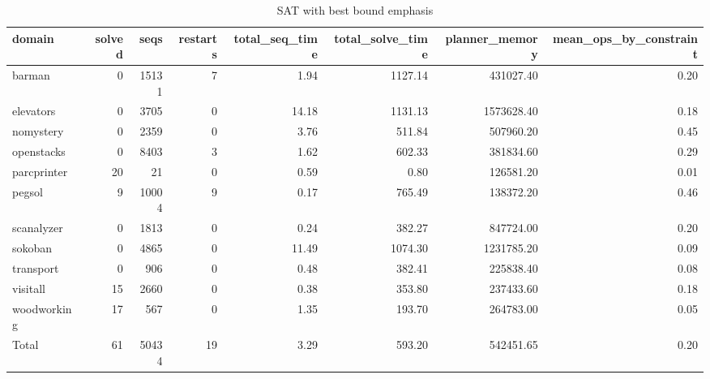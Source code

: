 \begin{table*}[htbp]
\centering
\begingroup\small
\begin{tabular}{lrrrrrrr}
  \hline
domain & solved & seqs & restarts & total\_seq\_time & total\_solve\_time & planner\_memory & mean\_ops\_by\_constraint \\ 
  \hline
barman &   0 & 15131 &   7 & 1.94 & 1127.14 & 431027.40 & 0.20 \\ 
  elevators &   0 & 3705 &   0 & 14.18 & 1131.13 & 1573628.40 & 0.18 \\ 
  nomystery &   0 & 2359 &   0 & 3.76 & 511.84 & 507960.20 & 0.45 \\ 
  openstacks &   0 & 8403 &   3 & 1.62 & 602.33 & 381834.60 & 0.29 \\ 
  parcprinter &  20 &  21 &   0 & 0.59 & 0.80 & 126581.20 & 0.01 \\ 
  pegsol &   9 & 10004 &   9 & 0.17 & 765.49 & 138372.20 & 0.46 \\ 
  scanalyzer &   0 & 1813 &   0 & 0.24 & 382.27 & 847724.00 & 0.20 \\ 
  sokoban &   0 & 4865 &   0 & 11.49 & 1074.30 & 1231785.20 & 0.09 \\ 
  transport &   0 & 906 &   0 & 0.48 & 382.41 & 225838.40 & 0.08 \\ 
  visitall &  15 & 2660 &   0 & 0.38 & 353.80 & 237433.60 & 0.18 \\ 
  woodworking &  17 & 567 &   0 & 1.35 & 193.70 & 264783.00 & 0.05 \\ 
  Total &  61 & 50434 &  19 & 3.29 & 593.20 & 542451.65 & 0.20 \\ 
   \hline
\end{tabular}
\endgroup
\caption{SAT with best bound emphasis} 
\label{tab:best_bound_sat}
\end{table*}

